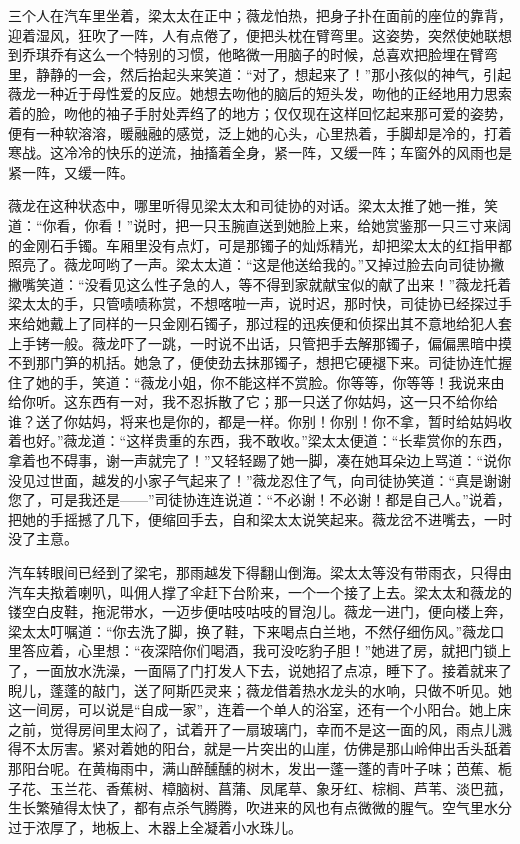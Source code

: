 \par 三个人在汽车里坐着，梁太太在正中；薇龙怕热，把身子扑在面前的座位的靠背，迎着湿风，狂吹了一阵，人有点倦了，便把头枕在臂弯里。这姿势，突然使她联想到乔琪乔有这么一个特别的习惯，他略微一用脑子的时候，总喜欢把脸埋在臂弯里，静静的一会，然后抬起头来笑道：“对了，想起来了！”那小孩似的神气，引起薇龙一种近于母性爱的反应。她想去吻他的脑后的短头发，吻他的正经地用力思索着的脸，吻他的袖子手肘处弄绉了的地方；仅仅现在这样回忆起来那可爱的姿势，便有一种软溶溶，暖融融的感觉，泛上她的心头，心里热着，手脚却是冷的，打着寒战。这冷冷的快乐的逆流，抽搐着全身，紧一阵，又缓一阵；车窗外的风雨也是紧一阵，又缓一阵。
\par 薇龙在这种状态中，哪里听得见梁太太和司徒协的对话。梁太太推了她一推，笑道：“你看，你看！”说时，把一只玉腕直送到她脸上来，给她赏鉴那一只三寸来阔的金刚石手镯。车厢里没有点灯，可是那镯子的灿烁精光，却把梁太太的红指甲都照亮了。薇龙呵哟了一声。梁太太道：“这是他送给我的。”又掉过脸去向司徒协撇撇嘴笑道：“没看见这么性子急的人，等不得到家就献宝似的献了出来！”薇龙托着梁太太的手，只管啧啧称赏，不想喀啦一声，说时迟，那时快，司徒协已经探过手来给她戴上了同样的一只金刚石镯子，那过程的迅疾便和侦探出其不意地给犯人套上手铐一般。薇龙吓了一跳，一时说不出话，只管把手去解那镯子，偏偏黑暗中摸不到那门笋的机括。她急了，便使劲去抹那镯子，想把它硬褪下来。司徒协连忙握住了她的手，笑道：“薇龙小姐，你不能这样不赏脸。你等等，你等等！我说来由给你听。这东西有一对，我不忍拆散了它；那一只送了你姑妈，这一只不给你给谁？送了你姑妈，将来也是你的，都是一样。你别！你别！你不拿，暂时给姑妈收着也好。”薇龙道：“这样贵重的东西，我不敢收。”梁太太便道：“长辈赏你的东西，拿着也不碍事，谢一声就完了！”又轻轻踢了她一脚，凑在她耳朵边上骂道：“说你没见过世面，越发的小家子气起来了！”薇龙忍住了气，向司徒协笑道：“真是谢谢您了，可是我还是——”司徒协连连说道：“不必谢！不必谢！都是自己人。”说着，把她的手摇撼了几下，便缩回手去，自和梁太太说笑起来。薇龙岔不进嘴去，一时没了主意。
\par 汽车转眼间已经到了梁宅，那雨越发下得翻山倒海。梁太太等没有带雨衣，只得由汽车夫揿着喇叭，叫佣人撑了伞赶下台阶来，一个一个接了上去。梁太太和薇龙的镂空白皮鞋，拖泥带水，一迈步便咕吱咕吱的冒泡儿。薇龙一进门，便向楼上奔，梁太太叮嘱道：“你去洗了脚，换了鞋，下来喝点白兰地，不然仔细伤风。”薇龙口里答应着，心里想：“夜深陪你们喝酒，我可没吃豹子胆！”她进了房，就把门锁上了，一面放水洗澡，一面隔了门打发人下去，说她招了点凉，睡下了。接着就来了睨儿，蓬蓬的敲门，送了阿斯匹灵来；薇龙借着热水龙头的水响，只做不听见。她这一间房，可以说是“自成一家”，连着一个单人的浴室，还有一个小阳台。她上床之前，觉得房间里太闷了，试着开了一扇玻璃门，幸而不是这一面的风，雨点儿溅得不太厉害。紧对着她的阳台，就是一片突出的山崖，仿佛是那山岭伸出舌头舐着那阳台呢。在黄梅雨中，满山醉醺醺的树木，发出一蓬一蓬的青叶子味；芭蕉、栀子花、玉兰花、香蕉树、樟脑树、菖蒲、凤尾草、象牙红、棕榈、芦苇、淡巴菰，生长繁殖得太快了，都有点杀气腾腾，吹进来的风也有点微微的腥气。空气里水分过于浓厚了，地板上、木器上全凝着小水珠儿。

